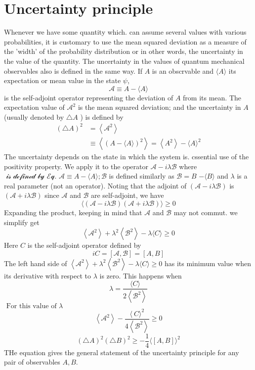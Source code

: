 \section{Uncertainty principle}
Whenever we have some quantity which. can assume several values with various probabilities, it is customary to use the mean squared deviation as a measure of the 'width' of the probability distribution or in other words, the uncertainty in the value of the quantity. The uncertainty in the values of quantum mechanical observables also is defined in the same way. If $A$ is an obscrvable and $\langle A\rangle$ its expectation or mean value in the state $\psi$,\\
$$\mathcal{A} \equiv A-\langle A\rangle$$
is the self-adjoint operator representing the deviation of $A$ from its mean. The expectation value of $\mathcal{A}^{2}$ is the mean squared deviation; and the uncertainty in $A$ (usually denoted by $\triangle A$ ) is defined by
$$
\begin{aligned}
(\triangle A)^{2} &=\left\langle \mathcal{A}^{2}\right\rangle \\
& \equiv\left\langle(A-\langle A\rangle)^{2}\right\rangle=\left\langle A^{2}\right\rangle-\langle A\rangle^{2}
\end{aligned}
$$
 The uncertainty depends on the state  in which the system is.
 cssential use of the positivity property. We apply it to the operator $\mathcal{A}-i \lambda \mathcal{B}$ where $\mathcal{\text { is defined by Eq. }}\mathcal{A} \equiv A-\langle A\rangle ; \mathcal{B}$ is defined similarly as $\mathcal{B}=B$ $-\langle B\rangle$ and $\lambda$ is a real parameter (not an operator). Noting that the adjoint of $(\mathcal{A}-i \lambda \mathcal{B})$ is $(\mathcal{A}+i \lambda \mathcal{B})$ since $\mathcal{A}$ and $\mathcal{B}$ are self-adjoint, we have 
 $$
 \langle(\mathcal{A}-i \lambda \mathcal{B})(\mathcal{A}+i \lambda \mathcal{B})\rangle \geqslant 0
 $$
 Expanding the product, keeping in mind that $\mathcal{A}$ and $\mathcal{B}$ may not commut. we simplify get\\
 $$\left\langle\mathcal{A}^{2}\right\rangle+\lambda^{2}\left\langle\mathcal{B}^{2}\right\rangle-\lambda\langle C \rangle \geqslant 0$$
 Here $C$ is the self-adjoint operator defined by
 $$
 i C=[\mathcal{A}, \mathcal{B}]=[A, B]
 $$
 The left hand side of $\left\langle\mathcal{A}^{2}\right\rangle+\lambda^{2}\left\langle\mathcal{B}^{2}\right\rangle-\lambda\langle C \rangle \geqslant 0$ has its minimum value when its derivative with respect to $\lambda$ is zero. This happens when
 $$
 \lambda=\frac{\langle C\rangle}{2\left\langle\mathcal{B}^{2}\right\rangle}
 $$
 $\text { For this value of } \lambda$\\
 $$\left\langle\mathcal{A}^{2}\right\rangle-\frac{\langle\ C \rangle^{2}}{4\left\langle\mathcal{B}^{2}\right\rangle} \geqslant 0$$
 $$(\triangle A)^{2}(\triangle B)^{2} \geqslant-\frac{1}{4}\langle[A, B]\rangle^{2}$$
THe equation gives the general statement of the uncertainty principle for any pair of observables $A, B$.


